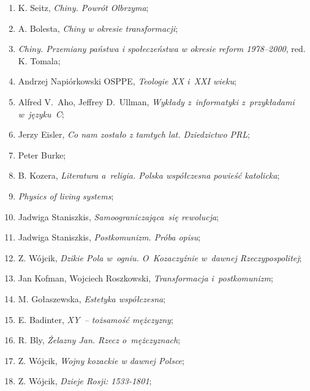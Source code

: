\documentclass[a4paper,11pt]{article}
\begin{document}
\begin{enumerate}
\item K. Seitz, \textit{Chiny. Powrót Olbrzyma};

\item A. Bolesta, \textit{Chiny w okresie transformacji};

\item \textit{Chiny. Przemiany państwa i społeczeństwa w okresie reform
    1978--2000}, red. K. Tomala;

\item Andrzej Napiórkowski OSPPE, \textit{Teologie XX i~XXI wieku};

\item Alfred V.~Aho, Jeffrey D.~Ullman, \textit{Wykłady z~informatyki
    z~przykładami w~języku~C};

\item Jerzy Eisler, \textit{Co nam zostało z tamtych lat. Dziedzictwo
    PRL};

\item Peter Burke;

\item B. Kozera, \textit{Literatura a~religia. Polska współczesna
    powieść katolicka};

\item \textit{Physics of living systems};

\item Jadwiga Staniszkis, \textit{Samoograniczająca~się rewolucja};

\item Jadwiga Staniszkis, \textit{Postkomunizm. Próba opisu};

\item Z. Wójcik, \textit{Dzikie Pola w~ogniu. O~Kozaczyźnie w~dawnej
    Rzeczypospolitej};

\item Jan Kofman, Wojciech Roszkowski, \textit{Transformacja
    i~postkomunizm};

\item M. Gołaszewska, \textit{Estetyka współczesna};

\item E. Badinter, \textit{XY~-- tożsamość mężczyzny};

\item R. Bly, \textit{Żelazny Jan. Rzecz o~mężczyznach};

\item Z. Wójcik, \textit{Wojny kozackie w dawnej Polsce};

\item Z. Wójcik, \textit{Dzieje Rosji: 1533-1801};


\end{enumerate}
\end{document}
